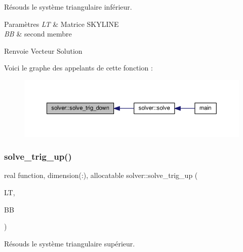 Résouds le système triangulaire inférieur. 


\begin{DoxyParams}{Paramètres}
{\em LT} & Matrice S\+K\+Y\+L\+I\+NE \\
\hline
{\em BB} & second membre \\
\hline
\end{DoxyParams}
\begin{DoxyReturn}{Renvoie}
Vecteur Solution 
\end{DoxyReturn}
Voici le graphe des appelants de cette fonction \+:
\nopagebreak
\begin{figure}[H]
\begin{center}
\leavevmode
\includegraphics[width=350pt]{namespacesolver_ad8b8ef6c982475b3fb276f93660b750f_icgraph}
\end{center}
\end{figure}
\mbox{\label{namespacesolver_a08b8f70c86d7bf39b32ce8fdcc872fd4}} 
\subsubsection{\texorpdfstring{solve\+\_\+trig\+\_\+up()}{solve\_trig\_up()}}
{\footnotesize\ttfamily real function, dimension(\+:), allocatable solver\+::solve\+\_\+trig\+\_\+up (\begin{DoxyParamCaption}\item[{type(skyline\+\_\+matrix)}]{LT,  }\item[{real, dimension(\+:), allocatable}]{BB }\end{DoxyParamCaption})}



Résouds le système triangulaire supérieur. 


